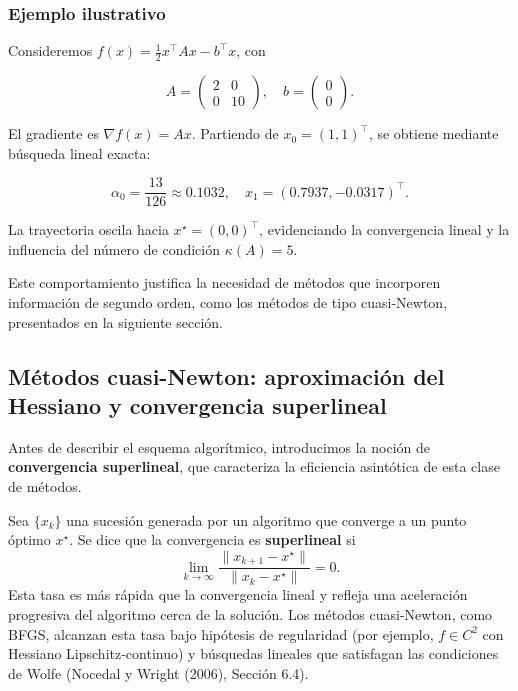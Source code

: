 \documentclass[
  spanish,
  us-letterpaper,
]{scrreprt}
\numberwithin{equation}{section}
\begin{document}
\subsubsection{Ejemplo ilustrativo}\label{ejemplo-ilustrativo-8}

Consideremos \(f(x) = \tfrac{1}{2}x^\top A x - b^\top x\), con

\[
  A = \begin{pmatrix} 2 & 0 \\ 0 & 10 \end{pmatrix}, \quad b = \begin{pmatrix} 0 \\ 0 \end{pmatrix}.
\]

El gradiente es \(\nabla f(x) = A x\). Partiendo de
\(x_0 = (1,1)^\top\), se obtiene mediante búsqueda lineal exacta:

\[
  \alpha_0 = \frac{13}{126} \approx 0.1032, \quad x_1 = (0.7937, -0.0317)^\top.
\]

La trayectoria oscila hacia \(x^\star = (0,0)^\top\), evidenciando la
convergencia lineal y la influencia del número de condición
\(\kappa(A) = 5\).

Este comportamiento justifica la necesidad de métodos que incorporen
información de segundo orden, como los métodos de tipo cuasi-Newton,
presentados en la siguiente sección.

\subsection{Métodos cuasi-Newton: aproximación del Hessiano y
convergencia superlineal}\label{sec-convergenciasuperlineal}

Antes de describir el esquema algorítmico, introducimos la noción de
\textbf{convergencia superlineal}, que caracteriza la eficiencia
asintótica de esta clase de métodos.

Sea \(\{x_k\}\) una sucesión generada por un algoritmo que converge a un
punto óptimo \(x^\star\). Se dice que la convergencia es
\textbf{superlineal} si\\
\[
\lim_{k \to \infty} \frac{\|x_{k+1} - x^\star\|}{\|x_k - x^\star\|} = 0.
\] Esta tasa es más rápida que la convergencia lineal y refleja una
aceleración progresiva del algoritmo cerca de la solución. Los métodos
cuasi-Newton, como BFGS, alcanzan esta tasa bajo hipótesis de
regularidad (por ejemplo, \(f \in C^2\) con Hessiano Lipschitz-continuo)
y búsquedas lineales que satisfagan las condiciones de Wolfe (Nocedal y
Wright (2006), Sección 6.4).
\end{document}

